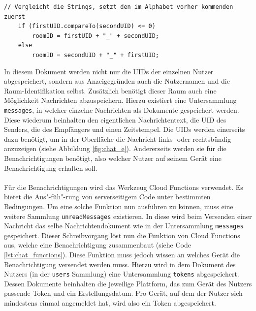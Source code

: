 \begin{lstlisting}[caption=Sortierung der UIDs, label=lst:chat_uid_sorting]
	// Vergleicht die Strings, setzt den im Alphabet vorher kommenden zuerst
	if (firstUID.compareTo(secondUID) <= 0)
		roomID = firstUID + "_" + secondUID;
	else
		roomID = secondUID + "_" + firstUID;
\end{lstlisting}

In diesem Dokument werden nicht nur die UIDs der einzelnen Nutzer abgespeichert, sondern aus Anzeigegründen auch die Nutzernamen und die Raum-Identifikation selbst.
Zusätzlich benötigt dieser Raum auch eine Möglichkeit Nachrichten abzuspeichern.
Hierzu existiert eine Untersammlung \texttt{messages}, in welcher einzelne Nachrichten als Dokumente gespeichert werden.
Diese wiederum beinhalten den eigentlichen Nachrichtentext, die UID des Senders, die des Empfängers und einen Zeitstempel.
Die UIDs werden einerseits dazu benötigt, um in der Oberfläche die Nachricht links- oder rechtsbündig anzuzeigen (siehe Abbildung \ref{fig:chat_e}).
Andererseits werden sie für die Benachrichtigungen benötigt, also welcher Nutzer auf seinem Gerät eine Benachrichtigung erhalten soll.\\
\\
Für die Benachrichtigungen wird das Werkzeug Cloud Functions verwendet.
Es bietet die Aus"-füh"-rung von serverseitigem Code unter bestimmten Bedingungen.
Um eine solche Funktion nun ausführen zu können, muss eine weitere Sammlung \texttt{unreadMessages} existieren.
In diese wird beim Versenden einer Nachricht das selbe Nachrichtendokument wie in der Untersammlung \texttt{messages} gespeichert.
Dieser Schreibvorgang löst nun die Funktion von Cloud Functions aus, welche eine Benachrichtigung zusammenbaut (siehe Code \ref{lst:chat_functions}).
Diese Funktion muss jedoch wissen an welches Gerät die Benachrichtigung versendet werden muss.
Hierzu wird in dem Dokument des Nutzers (in der \texttt{users} Sammlung) eine Untersammlung \texttt{tokens} abgespeichert.
Dessen Dokumente beinhalten die jeweilige Plattform, das zum Gerät des Nutzers passende Token und ein Erstellungsdatum.
Pro Gerät, auf dem der Nutzer sich mindestens einmal angemeldet hat, wird also ein Token abgespeichert.\\


